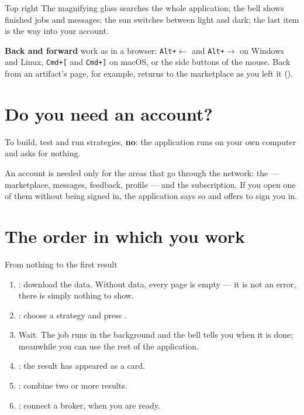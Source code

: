 \begin{nota}{Top right}
The magnifying glass searches the whole application; the bell shows finished
jobs and messages; the sun switches between light and dark; the last item is
the way into your account.
\end{nota}

\noindent
\textbf{Back and forward} work as in a browser: \texttt{Alt+}$\leftarrow$ and
\texttt{Alt+}$\rightarrow$ on Windows and Linux, \texttt{Cmd+[} and \texttt{Cmd+]} on
macOS, or the side buttons of the mouse. Back from an artifact's page, for
example, returns to the marketplace as you left it ().

\section{Do you need an account?}\label{sez:account-needed}

To build, test and run strategies, \textbf{no}: the application runs on your
own computer and asks for nothing.

An account is needed only for the areas that go through the network: the
 --- marketplace, messages, feedback, profile --- and the
subscription. If you open one of them without being signed in, the
application says so and offers to sign you in.

\section{The order in which you work}\label{sez:order}

\begin{pratica}{From nothing to the first result}
\begin{enumerate}
  \item {}: download the data. Without data,
        every page is empty --- it is not an error, there is simply nothing
        to show.
  \item {}: choose a strategy and press
        .
  \item Wait. The job runs in the background and the bell tells you when it
        is done; meanwhile you can use the rest of the application.
  \item {}: the result has appeared as a card.
  \item {}: combine two or more results.
  \item {}: connect a broker, when you are ready.
\end{enumerate}
\end{pratica}
